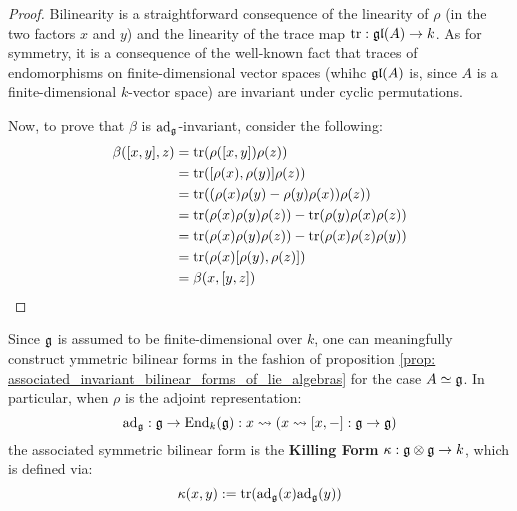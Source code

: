                         \begin{proof}
                            Bilinearity is a straightforward consequence of the linearity of $\rho$ (in the two factors $x$ and $y$) and the linearity of the trace map $\operatorname{tr}: \mathfrak{gl}(A) \to k$. As for symmetry, it is a consequence of the well-known fact that traces of endomorphisms on finite-dimensional vector spaces (whihc $\mathfrak{gl}(A)$ is, since $A$ is a finite-dimensional $k$-vector space) are invariant under cyclic permutations.
                            
                            Now, to prove that $\beta$ is $\mathrm{ad}_{\mathfrak{g}}$-invariant, consider the following:
                                $$
                                    \begin{aligned}
                                        \beta([x, y], z) & = \operatorname{tr}(\rho([x, y]) \rho(z))
                                        \\
                                        & = \operatorname{tr}([\rho(x), \rho(y)] \rho(z))
                                        \\
                                        & = \operatorname{tr}((\rho(x)\rho(y) - \rho(y)\rho(x)) \rho(z))
                                        \\
                                        & = \operatorname{tr}(\rho(x) \rho(y)\rho(z)) - \operatorname{tr}(\rho(y)\rho(x)\rho(z))
                                        \\
                                        & = \operatorname{tr}(\rho(x) \rho(y)\rho(z)) - \operatorname{tr}(\rho(x)\rho(z)\rho(y))
                                        \\
                                        & = \operatorname{tr}(\rho(x)[\rho(y), \rho(z)])
                                        \\
                                        & = \beta(x, [y, z])
                                    \end{aligned}
                                $$
                        \end{proof}
                    \begin{example} \label{example: the_killing_form}
                        Since $\mathfrak{g}$ is assumed to be finite-dimensional over $k$, one can meaningfully construct ymmetric bilinear forms in the fashion of proposition \ref{prop: associated_invariant_bilinear_forms_of_lie_algebras} for the case $A \simeq \mathfrak{g}$. In particular, when $\rho$ is the adjoint representation:
                            $$\mathrm{ad}_{\mathfrak{g}}: \mathfrak{g} \to \mathrm{End}_k(\mathfrak{g}): x \leadsto \left(x \leadsto [x, -]: \mathfrak{g} \to \mathfrak{g}\right)$$
                        the associated symmetric bilinear form is the \textbf{Killing Form} $\kappa: \g \tensor \g \to k$, which is defined via:
                            $$\kappa(x, y) := \operatorname{tr}(\mathrm{ad}_{\mathfrak{g}}(x) \mathrm{ad}_{\mathfrak{g}}(y))$$
                    \end{example}
                    
